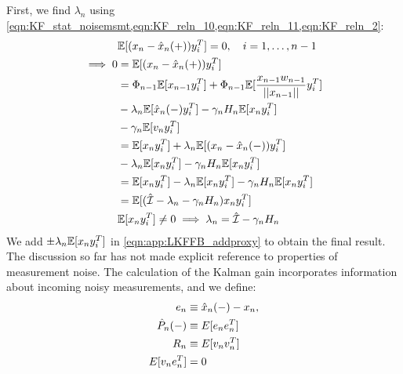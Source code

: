 First, we find $\lambda_n$ using \cref{eqn:KF_stat_noisemsmt,eqn:KF_reln_10,eqn:KF_reln_11,eqn:KF_reln_2}:
\begin{align}
&\mathbb{E}[(x_n - \hat{x}_{n}(+))y_i^T] =0, \quad i = 1,\dots, n-1\label{eqn:KF_reln_15}\\ 
\implies 0 & = \mathbb{E}[(x_n - \hat{x}_{n}(+))y_i^T] \\
& = \Phi_{n-1}\mathbb{E}[x_{n-1}y_i^T] + \Phi_{n-1}\mathbb{E}[\frac{x_{n-1}w_{n-1}}{||x_{n-1}||}y_i^T] \\
& - \lambda_n \mathbb{E}[ \hat{x}_n(-)y_i^T] - \gamma_n H_n \mathbb{E}[ x_n y_i^T]  \nonumber \\
& - \gamma_n \mathbb{E}[ v_n y_i^T] \nonumber \\
&= \mathbb{E}[x_{n}y_i^T] + \lambda_n \mathbb{E}[( x_n - \hat{x}_n(-))y_i^T] \\
&- \lambda_n \mathbb{E}[ x_n y_i^T]  - \gamma_n H_n\mathbb{E}[ x_n y_i^T] \label{eqn:app:LKFFB_addproxy} \nonumber \\
&= \mathbb{E}[x_{n}y_i^T] - \lambda_n \mathbb{E}[ x_n y_i^T] - \gamma_n H_n\mathbb{E}[ x_n y_i^T]\\
& = \mathbb{E}[(\hat{\mathcal{I}} - \lambda_n  - \gamma_n H_n)x_n y_i^T] \\
&\mathbb{E}[x_n y_i^T] \neq 0 \implies \lambda_n = \hat{\mathcal{I}}  - \gamma_n H_n
\end{align} We add $\pm \lambda_n \mathbb{E}[ x_n y_i^T]$ in \cref{eqn:app:LKFFB_addproxy} to obtain the final result. 
The discussion so far has not made explicit reference to properties of measurement noise. The calculation of the Kalman gain incorporates information about incoming noisy measurements, and we define:
\begin{align}
e_n & \equiv \hat{x}_{n}(-) - x_n,   \label{eqn:app:LKFFB_resid}\\
\hat{P}_{n}(-) & \equiv E[e_ne_n^T] \label{eqn:app:LKFFB_P}\\
R_n & \equiv E[v_nv_n^T] \label{eqn:app:LKFFB_R}\\
E[v_n e_n^T]&=0 \label{eqn:app:LKFFB_uncorr_resid}
\end{align}
